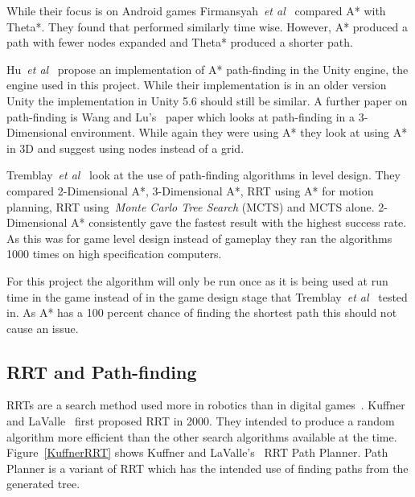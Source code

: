 \documentclass[journal]{IEEEtran}
\begin{document}
	While their focus is on Android games Firmansyah~\textit{et al}~\cite{Firmansyah2016} compared A* with Theta*. They found that performed similarly time wise. However, A* produced a path with fewer nodes expanded and Theta* produced a shorter path. 
	
	Hu~\textit{et al}~\cite{Hu2012} propose an implementation of A* path-finding in the Unity engine, the engine used in this project.  While their implementation is in an older version Unity the implementation in Unity 5.6 should still be similar. A further paper on path-finding is Wang and Lu's~\cite{wang2012} paper which looks at path-finding in a 3-Dimensional environment. While again they were using A* they look at using A* in 3D and suggest using nodes instead of a grid.
	
	Tremblay~\textit{et al}~\cite{Tremblay2014} look at the use of path-finding algorithms in level design. They compared 2-Dimensional A*, 3-Dimensional A*, RRT using A* for motion planning, RRT using~\textit{Monte Carlo Tree Search} (MCTS) and MCTS alone. 2-Dimensional A* consistently gave the fastest result with the highest success rate. As this was for game level design instead of gameplay they ran the algorithms 1000 times on high specification computers. 
	
	For this project the algorithm will only be run once as it is being used at run time in the game instead of in the game design stage that Tremblay~\textit{et al}~\cite{Tremblay2014} tested in. As A* has a 100 percent chance of finding the shortest path this should not cause an issue. 
	
	\subsection{RRT and Path-finding} \label{RRTadnPathfinding}
	RRTs are a search method used more in robotics than in digital games~\cite{LaValle1998, Kuffner2000}. Kuffner and LaValle~\cite{Kuffner2000} first proposed RRT in 2000. They intended to produce a random algorithm more efficient than the other search algorithms available at the time.  Figure~\ref{KuffnerRRT} shows Kuffner and LaValle's~\cite{Kuffner2000} RRT Path Planner. Path Planner is a variant of RRT which has the intended use of finding paths from the generated tree.
	
\end{document}
